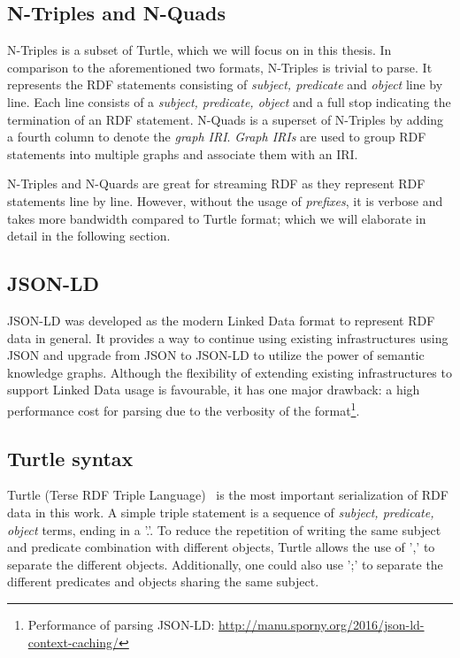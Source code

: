 \subsection{N-Triples and N-Quads}
N-Triples\cite{N-Triples} is a subset of Turtle, which we will focus on in this thesis. In comparison to the aforementioned two formats, N-Triples is trivial to parse. 
It represents the RDF statements consisting of \emph{subject, predicate} and \emph{object} line by line. 
Each line consists of a \emph{subject, predicate, object} and a full stop indicating the termination of 
an RDF statement. N-Quads is a superset of N-Triples by adding a fourth column to denote the \emph{graph IRI}.
\emph{Graph IRIs} are used to group RDF statements into multiple graphs and associate them with an IRI.  

N-Triples and N-Quards are great for streaming RDF as they 
represent RDF statements line by line. However, without the usage of \emph{prefixes}, it is verbose and takes more 
bandwidth compared to Turtle format; which we will elaborate in detail in the following section.


\subsection{JSON-LD}
JSON-LD\cite{JSON-LD} was developed as 
the modern Linked Data format to represent RDF data in general. 
It provides a way to continue using existing 
infrastructures using JSON and upgrade from JSON to JSON-LD to utilize the power of semantic knowledge graphs. 
Although the flexibility of extending existing infrastructures to support Linked Data usage 
is favourable, it has one major drawback: a high performance cost for parsing due to 
the verbosity of the format\footnote{Performance of parsing JSON-LD: \url{http://manu.sporny.org/2016/json-ld-context-caching/}}.


\subsection{Turtle syntax}
\label{sec:turtle_syntax}
Turtle (Terse RDF Triple Language)~\cite{turtle_syntax}
is the most important serialization of RDF data in this work.
 A simple triple statement is a sequence of
\textit{subject, predicate, object} terms, ending in a '.'.
To reduce the repetition of writing the same subject and predicate combination with
different objects, Turtle allows the use of ',' to separate the different objects.
Additionally, one could also use ';' to separate the different predicates and objects sharing the
same subject. 


